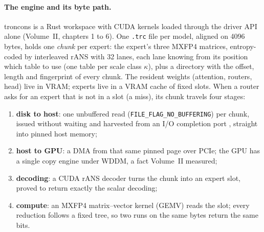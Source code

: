 \documentclass[11pt, a4paper]{article}
\theoremstyle{remark}
\begin{document}
\paragraph{The engine and its byte path.} troncons is a Rust workspace with CUDA kernels loaded through the driver API alone (Volume~II, chapters 1 to 6). One \texttt{.trc} file per model, aligned on \num{4096} bytes, holds one \emph{chunk} per expert: the expert's three MXFP4 matrices, entropy-coded by interleaved rANS with 32 lanes, each lane knowing from its position which table to use (one table per scale class $\kappa$), plus a directory with the offset, length and fingerprint of every chunk. The resident weights (attention, routers, head) live in VRAM; experts live in a VRAM cache of fixed slots. When a router asks for an expert that is not in a slot (a miss), its chunk travels four stages:
\begin{enumerate}
\item \textbf{disk to host}: one unbuffered read (\texttt{FILE\_FLAG\_NO\_BUFFERING}) per chunk, issued without waiting and harvested from an I/O completion port \citep{microsoft2025iocp}, straight into pinned host memory;
\item \textbf{host to GPU}: a DMA from that same pinned page over PCIe; the GPU has a single copy engine under WDDM, a fact Volume~II measured;
\item \textbf{decoding}: a CUDA rANS decoder turns the chunk into an expert slot, proved to return exactly the scalar decoding;
\item \textbf{compute}: an MXFP4 matrix--vector kernel (GEMV) reads the slot; every reduction follows a fixed tree, so two runs on the same bytes return the same bits.
\end{enumerate}
\end{document}
